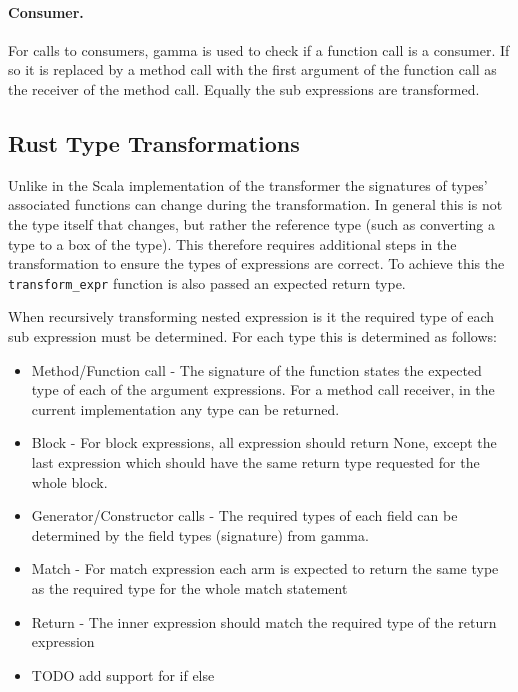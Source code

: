 \documentclass[ oneside,%
                    author={James Elgar},
                    degree={MEng},
                     title={Bidirectional transformer between functional and \\ object-oriented programming in Rust},
                  subtitle={}]{dissertation}
\begin{document}
\paragraph{Consumer. } For calls to consumers, gamma is used to check if a function call is a consumer. If so it is replaced by a method call with the first argument of the function call as the receiver of the method call. Equally the sub expressions are transformed.

\subsection{Rust Type Transformations}


Unlike in the Scala implementation of the transformer the signatures of types' associated functions can change during the transformation. In general this is not the type itself that changes, but rather the reference type (such as converting a type to a box of the type). This therefore requires additional steps in the transformation to ensure the types of expressions are correct. To achieve this the \verb|transform_expr| function is also passed an expected return type.

When recursively transforming nested expression is it the required type of each sub expression must be determined. For each type this is determined as follows:

\begin{itemize}
    \item Method/Function call - The signature of the function states the expected type of each of the argument expressions. For a method call receiver, in the current implementation any type can be returned. %
    \item Block - For block expressions, all expression should return None, except the last expression which should have the same return type requested for the whole block.
    \item Generator/Constructor calls - The required types of each field can be determined by the field types (signature) from gamma.
    \item Match - For match expression each arm is expected to return the same type as the required type for the whole match statement
    \item Return - The inner expression should match the required type of the return expression
    \item TODO add support for if else  
\end{itemize}
\end{document}
